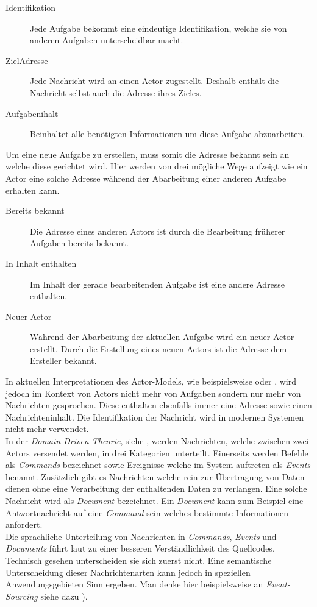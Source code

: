\begin{description}
  \item[Identifikation] Jede Aufgabe bekommt eine eindeutige Identifikation, welche sie von anderen Aufgaben unterscheidbar macht.
  \item[ZielAdresse] Jede Nachricht wird an einen Actor zugestellt. Deshalb enthält die Nachricht selbst auch die Adresse ihres Zieles.
  \item[Aufgabenihalt] Beinhaltet alle benötigten Informationen um diese Aufgabe abzuarbeiten.
\end{description} 
Um eine neue Aufgabe zu erstellen, muss somit die Adresse bekannt sein an welche diese gerichtet wird. Hier werden von \cite{Agha1985ActorsSystems} drei mögliche Wege aufzeigt wie ein Actor eine solche Adresse während der Abarbeitung einer anderen Aufgabe erhalten kann.
\begin{description}
  \item[Bereits bekannt] Die Adresse eines anderen Actors ist durch die Bearbeitung früherer Aufgaben bereits bekannt.
  \item[In Inhalt enthalten] Im Inhalt der gerade bearbeitenden Aufgabe ist eine andere Adresse enthalten.
  \item[Neuer Actor] Während der Abarbeitung der aktuellen Aufgabe wird ein neuer Actor erstellt. 
  Durch die Erstellung eines neuen Actors ist die Adresse dem Ersteller bekannt.  
\end{description}
In aktuellen Interpretationen des Actor-Models, wie beispielsweise \cite{Vernon2015ReactiveAkka} oder \cite{Brown2016ReactiveAkka.net.}, wird jedoch im Kontext von Actors nicht mehr von Aufgaben sondern nur mehr von Nachrichten gesprochen. Diese enthalten ebenfalls immer eine Adresse sowie einen Nachrichteninhalt. Die Identifikation der Nachricht wird in modernen Systemen nicht mehr verwendet.  \\
In der \textit{Domain-Driven-Theorie}, siehe \cite{Evans2004Domain-drivenSoftware}, werden Nachrichten, welche zwischen zwei Actors versendet werden, in drei Kategorien unterteilt. Einerseits werden Befehle als \textit{Commands} bezeichnet sowie Ereignisse welche im System auftreten als \textit{Events} benannt. Zusätzlich gibt es Nachrichten welche rein zur Übertragung von Daten dienen ohne eine Verarbeitung der enthaltenden Daten zu verlangen. Eine solche Nachricht wird als \textit{Document} bezeichnet. Ein \textit{Document} kann zum Beispiel eine Antwortnachricht auf eine \textit{Command} sein welches bestimmte Informationen anfordert.\\
Die sprachliche Unterteilung von Nachrichten in \textit{Commands}, \textit{Events} und \textit{Documents} führt laut \cite{Evans2004Domain-drivenSoftware} zu einer besseren Verständlichkeit des Quellcodes. Technisch gesehen unterscheiden sie sich zuerst nicht. Eine semantische Unterscheidung dieser Nachrichtenarten kann jedoch in speziellen Anwendungsgebieten Sinn ergeben. Man denke hier beispielsweise an \textit{Event-Sourcing} siehe dazu \cite{betts2013CQRSEventSourcing}).

